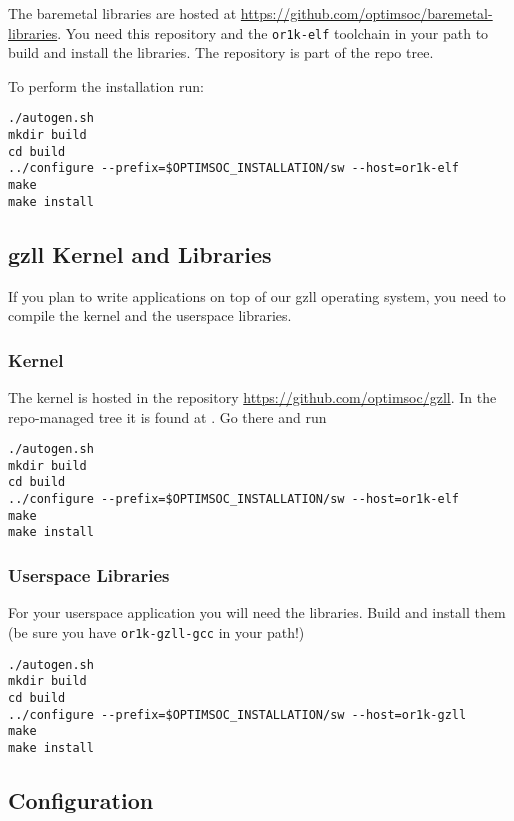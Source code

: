 The baremetal libraries are hosted at
\url{https://github.com/optimsoc/baremetal-libraries}. You need this
repository and the \verb|or1k-elf| toolchain in your path to build and
install the libraries. The repository is part of the repo tree.

To perform the installation run:

\begin{lstlisting}
./autogen.sh
mkdir build
cd build
../configure --prefix=$OPTIMSOC_INSTALLATION/sw --host=or1k-elf
make
make install
\end{lstlisting}

\subsection{gzll Kernel and Libraries}

If you plan to write applications on top of our gzll operating system,
you need to compile the kernel and the userspace libraries.

\subsubsection{Kernel}

The kernel is hosted in the repository
\url{https://github.com/optimsoc/gzll}. In the repo-managed tree it is
found at . Go there and run

\begin{lstlisting}
./autogen.sh
mkdir build
cd build
../configure --prefix=$OPTIMSOC_INSTALLATION/sw --host=or1k-elf
make
make install
\end{lstlisting}

\subsubsection{Userspace Libraries}

For your userspace application you will need the libraries. Build and
install them (be sure you have \verb|or1k-gzll-gcc| in your path!)

\begin{lstlisting}
./autogen.sh
mkdir build
cd build
../configure --prefix=$OPTIMSOC_INSTALLATION/sw --host=or1k-gzll
make
make install
\end{lstlisting}

\subsection{Configuration}

